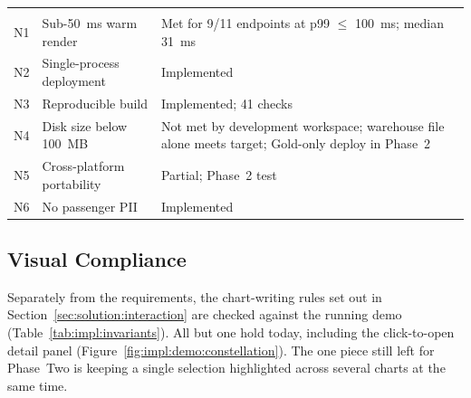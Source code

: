 \begin{table}[!htbp]
\begin{tabularx}{\linewidth}{@{}>{\raggedright\arraybackslash}p{0.75cm}>{\raggedright\arraybackslash}X>{\raggedright\arraybackslash}p{4.15cm}@{}}
    \multicolumn{3}{l}{\textit{Non-functional}} \\
    N1  & Sub-50~ms warm render                                & Met for 9/11 endpoints at p99 $\leq$ 100~ms; median 31~ms \\
    N2  & Single-process deployment                            & Implemented \\
    N3  & Reproducible build                                   & Implemented; 41 checks \\
    N4  & Disk size below 100~MB                               & Not met by development workspace; warehouse file alone meets target; Gold-only deploy in Phase~2 \\
    N5  & Cross-platform portability                           & Partial; Phase~2 test \\
    N6  & No passenger PII                                     & Implemented \\
    \hline
  \end{tabularx}
\end{table}

\subsection{Visual Compliance}
\label{sec:impl:eval:invariants}

Separately from the requirements, the chart-writing rules set out in
Section~\ref{sec:solution:interaction} are checked against the running
demo (Table~\ref{tab:impl:invariants}). All but one hold today,
including the click-to-open detail panel
(Figure~\ref{fig:impl:demo:constellation}). The one piece still left for
Phase~Two is keeping a single selection highlighted across several
charts at the same time.

